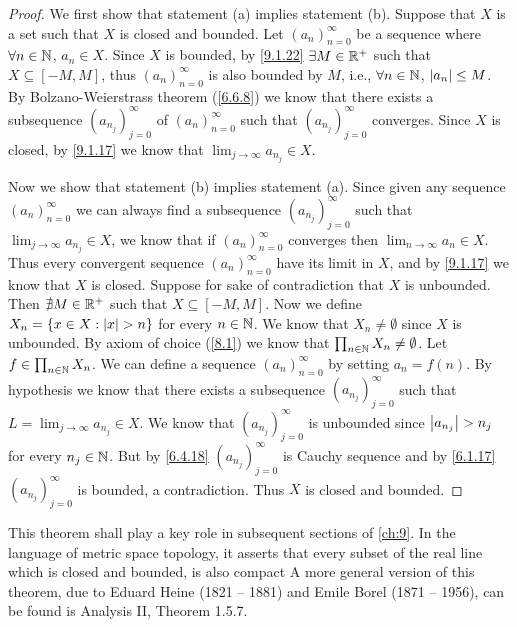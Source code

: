 \begin{proof}
  We first show that statement (a) implies statement (b).
  Suppose that \(X\) is a set such that \(X\) is closed and bounded.
  Let \((a_n)_{n = 0}^\infty\) be a sequence where \(\forall n \in \mathbb{N}\), \(a_n \in X\).
  Since \(X\) is bounded, by \cref{9.1.22} \(\exists M \in \mathbb{R}^+\) such that \(X \subseteq [-M, M]\), thus \((a_n)_{n = 0}^\infty\) is also bounded by \(M\), i.e., \(\forall n \in \mathbb{N}\), \(\left\lvert a_n\right\rvert \leq M\).
  By Bolzano-Weierstrass theorem (\cref{6.6.8}) we know that there exists a subsequence \((a_{n_j})_{j = 0}^\infty\) of \((a_n)_{n = 0}^\infty\) such that \((a_{n_j})_{j = 0}^\infty\) converges.
  Since \(X\) is closed, by \cref{9.1.17} we know that \(\lim_{j \to \infty} a_{n_j} \in X\).

  Now we show that statement (b) implies statement (a).
  Since given any sequence \((a_n)_{n = 0}^\infty\) we can always find a subsequence \((a_{n_j})_{j = 0}^\infty\) such that \(\lim_{j \to \infty} a_{n_j} \in X\), we know that if \((a_n)_{n = 0}^\infty\) converges then \(\lim_{n \to \infty} a_n \in X\).
  Thus every convergent sequence \((a_n)_{n = 0}^\infty\) have its limit in \(X\), and by \cref{9.1.17} we know that \(X\) is closed.
  Suppose for sake of contradiction that \(X\) is unbounded.
  Then \(\nexists M \in \mathbb{R}^+\) such that \(X \subseteq [-M, M]\).
  Now we define \(X_n = \{x \in X : \left\lvert x\right\rvert > n\}\) for every \(n \in \mathbb{N}\).
  We know that \(X_n \neq \emptyset\) since \(X\) is unbounded.
  By axiom of choice (\cref{8.1}) we know that \(\prod_{n \in \mathbb{N}} X_n \neq \emptyset\).
  Let \(f \in \prod_{n \in \mathbb{N}} X_n\).
  We can define a sequence \((a_n)_{n = 0}^\infty\) by setting \(a_n = f(n)\).
  By hypothesis we know that there exists a subsequence \((a_{n_j})_{j = 0}^\infty\) such that \(L = \lim_{j \to \infty} a_{n_j} \in X\).
  We know that \((a_{n_j})_{j = 0}^\infty\) is unbounded since \(\left\lvert a_{n_j}\right\rvert > n_j\) for every \(n_j \in \mathbb{N}\).
  But by \cref{6.4.18} \((a_{n_j})_{j = 0}^\infty\) is Cauchy sequence and by \cref{6.1.17} \((a_{n_j})_{j = 0}^\infty\) is bounded, a contradiction.
  Thus \(X\) is closed and bounded.
\end{proof}

\begin{rmk}\label{9.1.25}
  This theorem shall play a key role in subsequent sections of \cref{ch:9}.
  In the language of metric space topology, it asserts that every subset of the real line which is closed and bounded, is also compact
  A more general version of this theorem, due to Eduard Heine (1821 -- 1881) and Emile Borel (1871 -- 1956), can be found is Analysis II, Theorem 1.5.7.
\end{rmk}


